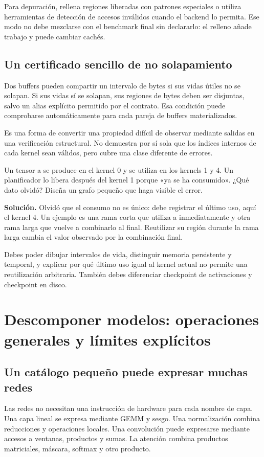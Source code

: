\documentclass[12pt,a4paper,oneside]{report}
\begin{document}
Para depuración, rellena regiones liberadas con patrones especiales o utiliza herramientas de detección de accesos inválidos cuando el backend lo permita. Ese modo no debe mezclarse con el benchmark final sin declararlo: el relleno añade trabajo y puede cambiar cachés.

\section{Un certificado sencillo de no solapamiento}
Dos buffers pueden compartir un intervalo de bytes si sus vidas útiles no se solapan. Si sus vidas sí se solapan, sus regiones de bytes deben ser disjuntas, salvo un alias explícito permitido por el contrato. Esa condición puede comprobarse automáticamente para cada pareja de buffers materializados.

Es una forma de convertir una propiedad difícil de observar mediante salidas en una verificación estructural. No demuestra por sí sola que los índices internos de cada kernel sean válidos, pero cubre una clase diferente de errores.

\begin{practica}
Un tensor a se produce en el kernel 0 y se utiliza en los kernels 1 y 4. Un planificador lo libera después del kernel 1 porque «ya se ha consumido». ¿Qué dato olvidó? Diseña un grafo pequeño que haga visible el error.

\end{practica}
\textbf{Solución.} Olvidó que el consumo no es único: debe registrar el último uso, aquí el kernel 4. Un ejemplo es una rama corta que utiliza a inmediatamente y otra rama larga que vuelve a combinarlo al final. Reutilizar su región durante la rama larga cambia el valor observado por la combinación final.

\begin{comprueba}
Debes poder dibujar intervalos de vida, distinguir memoria persistente y temporal, y explicar por qué último uso igual al kernel actual no permite una reutilización arbitraria. También debes diferenciar checkpoint de activaciones y checkpoint en disco.

\end{comprueba}
\chapter{Descomponer modelos: operaciones generales y límites explícitos}
\label{ch:ops_modelos}
\section{Un catálogo pequeño puede expresar muchas redes}
Las redes no necesitan una instrucción de hardware para cada nombre de capa. Una capa lineal se expresa mediante GEMM y sesgo. Una normalización combina reducciones y operaciones locales. Una convolución puede expresarse mediante accesos a ventanas, productos y sumas. La atención combina productos matriciales, máscara, softmax y otro producto.
\end{document}
